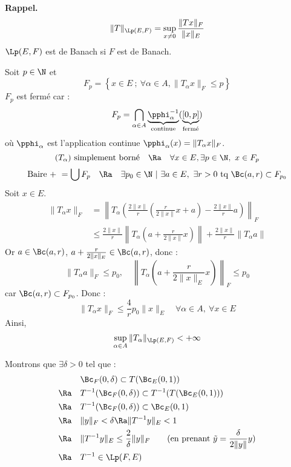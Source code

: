 \textbf{Rappel.}
$$\|T\|_{\Lp(E,F)}=\sup_{x\neq 0}\frac{\|T x\|_F}{\|x\|_E}$$
$\Lp(E,F)$ est de Banach si $F$ est de Banach.

\prvv
Soit $p\in\N$ et 
$$F_p=\left\{x\in E\ ;\ \forall\alpha\in A, \|T_\alpha x\|_F\le p\right\}$$
$F_p$ est fermé car :
$$F_p=\bigcap_{\alpha\in A}\underset{\text{continue}}{\underbrace{\pphi_\alpha^{-1}}}(\underset{\text{fermé}}{\underbrace{[0,p]}})$$
où $\pphi_\alpha$ est l'application continue $\pphi_\alpha(x)=\|T_\alpha x\|_F$.
$$(T_\alpha)\text{ simplement borné}\quad\Ra\quad \forall x\in E,\exists p\in\N,\ x\in F_p$$
$$\text{Baire }+\ =\bigcup F_p\quad\Ra\quad\exists p_0\in\N\ |\ \exists a\in E,\ \exists r>0 \text{ tq }\Bc(a,r)\subset F_{p_0}$$
Soit $x\in E$.
\begin{align*}
  \|T_\alpha x\|_F &=\left\|T_\alpha\left(\frac{2\|x\|}{r}\left(\frac{r}{2\|x\|}x+a\right)-\frac{2\|x\|}{r}a\right)\right\|_F\\
  &\le\frac{2\|x\|}{r}\left\|T_\alpha\left(a+\frac{r}{2\|x\|}x\right)\right\|+\frac{2\|x\|}{r}\|T_\alpha a\|
\end{align*}
Or $a\in\Bc(a,r)$, $a+\frac{r}{2\|x\|_E}\in\Bc(a,r)$, donc :
$$\|T_\alpha a\|_F\le p_0,\quad\left\|T_\alpha\left(a+\frac{r}{2\|x\|_E}x\right)\right\|_F\le p_0$$
car $\Bc(a,r)\subset F_{p_0}$. Donc :
$$\|T_\alpha x\|_F\le\frac 4 r p_0\|x\|_E\quad\forall\alpha\in A,\ \forall x\in E$$
Ainsi,
$$\sup_{\alpha\in A}\|T_\alpha\|_{\Lp(E,F)}<+\infty$$
\prvf

\prvv
Montrons que $\exists\delta>0$ tel que :
\begin{align*}
  &\Bc_F(0,\delta)\subset T(\Bc_E(0,1))\\
  \Ra\quad& T^{-1}(\Bc_F(0,\delta))\subset T^{-1}(T(\Bc_E(0,1)))\\
  \Ra\quad& T^{-1}(\Bc_F(0,\delta))\subset \Bc_E(0,1)\\
  \Ra\quad& \|y\|_F<\delta\Ra\|T^{-1}y\|_E<1\\
  \Ra\quad&\|T^{-1}y\|_E\le\frac 2\delta\|y\|_F\quad\quad(\text{en prenant }\tilde y=\frac{\delta}{2\|y\|}y)\\
  \Ra\quad& T^{-1}\in\Lp(F,E)
\end{align*}

